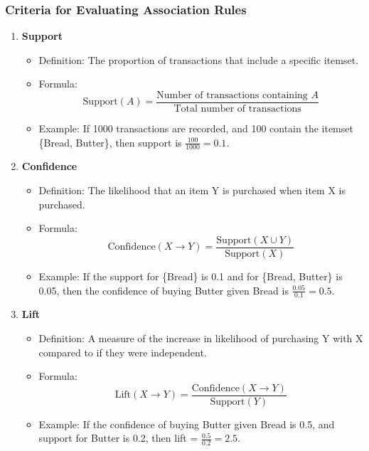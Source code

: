 \documentclass[aspectratio=169]{beamer}
\begin{document}
\begin{frame}[fragile]
    \frametitle{Criteria for Evaluating Association Rules}
    \begin{enumerate}
        \item \textbf{Support}
        \begin{itemize}
            \item Definition: The proportion of transactions that include a specific itemset.
            \item Formula:  
            \begin{equation}
            \text{Support}(A) = \frac{\text{Number of transactions containing } A}{\text{Total number of transactions}}
            \end{equation}
            \item Example: If 1000 transactions are recorded, and 100 contain the itemset \{Bread, Butter\}, then support is \( \frac{100}{1000} = 0.1\).
        \end{itemize}
        
        \item \textbf{Confidence}
        \begin{itemize}
            \item Definition: The likelihood that an item Y is purchased when item X is purchased.
            \item Formula:  
            \begin{equation}
            \text{Confidence}(X \rightarrow Y) = \frac{\text{Support}(X \cup Y)}{\text{Support}(X)}
            \end{equation}
            \item Example: If the support for \{Bread\} is 0.1 and for \{Bread, Butter\} is 0.05, then the confidence of buying Butter given Bread is \( \frac{0.05}{0.1} = 0.5\).
        \end{itemize}
        
        \item \textbf{Lift}
        \begin{itemize}
            \item Definition: A measure of the increase in likelihood of purchasing Y with X compared to if they were independent.
            \item Formula:  
            \begin{equation}
            \text{Lift}(X \rightarrow Y) = \frac{\text{Confidence}(X \rightarrow Y)}{\text{Support}(Y)}
            \end{equation}
            \item Example: If the confidence of buying Butter given Bread is 0.5, and support for Butter is 0.2, then lift = \( \frac{0.5}{0.2} = 2.5\).
        \end{itemize}
    \end{enumerate}
\end{frame}
\end{document}
